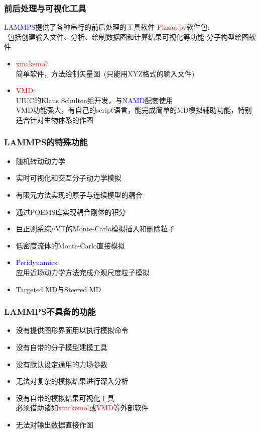 \frame
{
	\frametitle{前后处理与可视化工具}
	\textrm{\textcolor{blue}{LAMMPS}}提供了各种串行的前后处理的工具软件
\vskip 15pt
	\textcolor{brown}{\textrm{Pizzaa.py}}软件包:\\\
	包括创建输入文件、分析、绘制数据图和计算结果可视化等功能
\vskip 15pt
分子构型绘图软件 
	\begin{itemize}
			\setlength{\itemsep}{8pt}
		\item \textcolor{red}{xmakemol}:\\
			简单软件，方法绘制矢量图~(只能用\textrm{XYZ}格式的输入文件)
		\item \textcolor{red}{VMD}:\\
			\textrm{UIUC}的\textrm{Klaus Schulten}组开发，与\textrm{\textcolor{blue}{NAMD}}配套使用\\
			\textrm{VMD}功能强大，有自己的\textrm{script}语言，能完成简单的\textrm{MD}模拟辅助功能，特别适合针对生物体系的作图
	\end{itemize}
}

\frame
{
	\frametitle{\textrm{LAMMPS}的特殊功能}
	\begin{itemize}
			\setlength{\itemsep}{5pt}
		\item 随机转动动力学
		\item 实时可视化和交互分子动力学模拟
		\item 有限元方法实现的原子与连续模型的耦合
		\item 通过\textrm{POEMS}库实现耦合刚体的积分
		\item 巨正则系综\textrm{$\mu$VT}的\textrm{Monte-Carlo}模拟插入和删除粒子
		\item 低密度流体的\textrm{Monte-Carlo}直接模拟
		\item \textcolor{blue}{Peridynamics}:\\
			应用近场动力学方法完成介观尺度粒子模拟
		\item \textrm{Targeted MD}与\textrm{Steered MD}
	\end{itemize}
}

\frame
{
	\frametitle{\textrm{LAMMPS}不具备的功能}
	\begin{itemize}
			\setlength{\itemsep}{10pt}
			\item %
				没有提供图形界面用以执行模拟命令
		\item 没有自带的分子模型建模工具
		\item 没有默认设定通用的力场参数
		\item 无法对复杂的模拟结果进行深入分析
		\item 没有自带的模拟结果可视化工具\\
			必须借助诸如\textcolor{red}{xmakemol}或\textcolor{red}{VMD}等外部软件
		\item 无法对输出数据直接作图
	\end{itemize}
}


